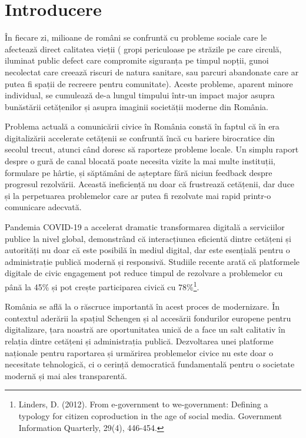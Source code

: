 \documentclass[12pt,a4paper]{report}
\begin{document}
\chapter*{Introducere}

În fiecare zi, milioane de români se confruntă cu probleme sociale care le afectează direct calitatea vieții ( gropi periculoase pe străzile pe care circulă, iluminat public defect care compromite siguranța pe timpul nopții, gunoi necolectat care creează riscuri de natura sanitare, sau parcuri abandonate care ar putea fi spații de recreere pentru comunitate). Aceste probleme, aparent minore individual, se cumulează de-a lungul timpului  într-un impact major asupra bunăstării cetățenilor și asupra imaginii societății  moderne din România.

Problema actuală a  comunicării civice în România constă în faptul că în era digitalizării accelerate cetățenii se confruntă încă cu bariere birocratice din secolul trecut, atunci când doresc să raporteze probleme locale. Un simplu raport despre o gură de canal blocată poate necesita vizite la mai multe  instituții, formulare pe hârtie, și săptămâni de așteptare fără niciun feedback despre progresul rezolvării. Această ineficiență nu doar că frustrează cetățenii, dar duce și la perpetuarea problemelor care ar putea fi rezolvate mai rapid printr-o comunicare adecvată.

Pandemia COVID-19 a accelerat dramatic transformarea digitală a serviciilor publice la nivel global, demonstrând că interacțiunea eficientă dintre cetățeni și autorități nu doar că este posibilă în mediul digital, dar este esențială pentru o administrație publică modernă și responsivă. Studiile recente arată că platformele digitale de civic engagement pot reduce timpul de rezolvare a problemelor cu până la 45\% și pot crește participarea civică cu 78\%\footnote{Linders, D. (2012). From e-government to we-government: Defining a typology for citizen coproduction in the age of social media. Government Information Quarterly, 29(4), 446-454.}.

România se află la o răscruce importantă în acest proces de modernizare. În contextul aderării la spațiul Schengen și al accesării fondurilor europene pentru digitalizare, țara noastră are oportunitatea unică de a face un salt calitativ în relația dintre cetățeni și administrația publică. Dezvoltarea unei platforme naționale pentru raportarea și urmărirea problemelor civice nu este doar o necesitate tehnologică, ci o cerință democratică fundamentală pentru o societate modernă și mai ales transparentă.
\end{document}

